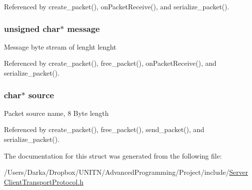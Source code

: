 Referenced by create\+\_\+packet(), on\+Packet\+Receive(), and serialize\+\_\+packet().

\subsubsection[{\texorpdfstring{message}{message}}]{\setlength{\rightskip}{0pt plus 5cm}unsigned char$\ast$ message}\hypertarget{structpacket__basic__t_abb13456032cf48eaa794391b6ed937c7}{}\label{structpacket__basic__t_abb13456032cf48eaa794391b6ed937c7}
Message byte stream of lenght lenght 

Referenced by create\+\_\+packet(), free\+\_\+packet(), on\+Packet\+Receive(), and serialize\+\_\+packet().

\subsubsection[{\texorpdfstring{source}{source}}]{\setlength{\rightskip}{0pt plus 5cm}char$\ast$ source}\hypertarget{structpacket__basic__t_aee6937c81d468a0915308234d09d212c}{}\label{structpacket__basic__t_aee6937c81d468a0915308234d09d212c}
Packet source name, 8 Byte length 

Referenced by create\+\_\+packet(), free\+\_\+packet(), send\+\_\+packet(), and serialize\+\_\+packet().



The documentation for this struct was generated from the following file\+:\begin{DoxyCompactItemize}
\item 
/\+Users/\+Darka/\+Dropbox/\+U\+N\+I\+T\+N/\+Advanced\+Programming/\+Project/include/\hyperlink{_server_client_transport_protocol_8h}{Server\+Client\+Transport\+Protocol.\+h}\end{DoxyCompactItemize}
